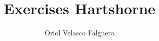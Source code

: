 \documentclass[12pt]{article}
\theoremstyle{definition}
\begin{document}
\title{Exercises Hartshorne}
\author{Oriol Velasco Falguera}
\maketitle


\newpage

\end{document}
